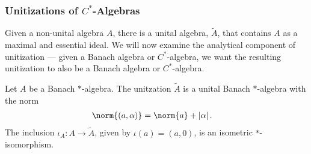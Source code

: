\documentclass[10pt]{mypackage}
\begin{document}
\subsubsection{Unitizations of $C^{\ast}$-Algebras}%
Given a non-unital algebra $A$, there is a unital algebra, $\widetilde{A}$, that contains $A$ as a maximal and essential ideal. We will now examine the analytical component of unitization --- given a Banach algebra or $C^{\ast}$-algebra, we want the resulting unitization to also be a Banach algebra or $C^{\ast}$-algebra.
\begin{proposition}
  Let $A$ be a Banach $\ast$-algebra. The unitzation $\widetilde{A}$ is a unital Banach $\ast$-algebra with the norm
  \begin{align*}
    \norm{\left(a,\alpha\right)} &= \norm{a} + \left\vert \alpha \right\vert.
  \end{align*}
  The inclusion $\iota_A\colon A\rightarrow \widetilde{A}$, given by $\iota(a) = \left(a,0\right)$, is an isometric $\ast$-isomorphism.
\end{proposition}
\end{document}
